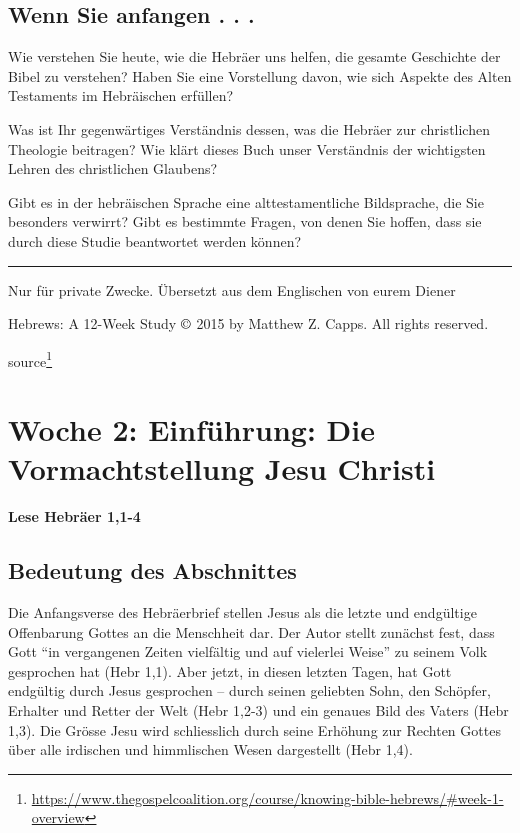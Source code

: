 \documentclass[
  12pt,
]{krantz}
\makeatletter
\newenvironment{kframe}{%
\medskip{}
\setlength{\fboxsep}{.8em}
 \def\at@end@of@kframe{}%
 \ifinner\ifhmode%
  \def\at@end@of@kframe{\end{minipage}}%
  \begin{minipage}{\columnwidth}%
 \fi\fi%
 \def\FrameCommand##1{\hskip\@totalleftmargin \hskip-\fboxsep
 \colorbox{shadecolor}{##1}\hskip-\fboxsep
     \hskip-\linewidth \hskip-\@totalleftmargin \hskip\columnwidth}%
 \MakeFramed {\advance\hsize-\width
   \@totalleftmargin\z@ \linewidth\hsize
   \@setminipage}}%
 {\par\unskip\endMakeFramed%
 \at@end@of@kframe}
\newenvironment{rmdblock}[1]
  {
  \begin{itemize}
  \renewcommand{\labelitemi}{
    \raisebox{-.7\height}[0pt][0pt]{
      {\setkeys{Gin}{width=3em,keepaspectratio}\texttt{[image: img/\#1]}}
    }
  }
  \setlength{\fboxsep}{1em}
  \begin{kframe}
  \item
  }
  {
  \end{kframe}
  \end{itemize}
  }
\newenvironment{rmdbible}
  {\begin{rmdblock}{bible}}
  {\end{rmdblock}}
\renewcommand{\href}[2]{#2\footnote{\url{#1}}}
\makeatother
\begin{document}
\hypertarget{wenn-sie-anfangen-.-.-.}{%
\section{Wenn Sie anfangen . . .}\label{wenn-sie-anfangen-.-.-.}}

Wie verstehen Sie heute, wie die Hebräer uns helfen, die gesamte Geschichte der Bibel zu verstehen? Haben Sie eine Vorstellung davon, wie sich Aspekte des Alten Testaments im Hebräischen erfüllen?

Was ist Ihr gegenwärtiges Verständnis dessen, was die Hebräer zur christlichen Theologie beitragen? Wie klärt dieses Buch unser Verständnis der wichtigsten Lehren des christlichen Glaubens?

Gibt es in der hebräischen Sprache eine alttestamentliche Bildsprache, die Sie besonders verwirrt? Gibt es bestimmte Fragen, von denen Sie hoffen, dass sie durch diese Studie beantwortet werden können?

\begin{center}\rule{0.5\linewidth}{0.5pt}\end{center}

Nur für private Zwecke. Übersetzt aus dem Englischen von eurem Diener

Hebrews: A 12-Week Study \(\copyright\) 2015 by Matthew Z. Capps. All rights reserved.

\href{https://www.thegospelcoalition.org/course/knowing-bible-hebrews/\#week-1-overview}{source}

\hypertarget{woche02}{%
\chapter{Woche 2: Einführung: Die Vormachtstellung Jesu Christi}\label{woche02}}

\begin{rmdbible}
\textbf{Lese Hebräer 1,1-4}
\end{rmdbible}

\hypertarget{bedeutung-des-abschnittes}{%
\section{Bedeutung des Abschnittes}\label{bedeutung-des-abschnittes}}

Die Anfangsverse des Hebräerbrief stellen Jesus als die letzte und endgültige Offenbarung Gottes an die Menschheit dar. Der Autor stellt zunächst fest, dass Gott ``in vergangenen Zeiten vielfältig und auf vielerlei Weise'' zu seinem Volk gesprochen hat (Hebr 1,1). Aber jetzt, in diesen letzten Tagen, hat Gott endgültig durch Jesus gesprochen -- durch seinen geliebten Sohn, den Schöpfer, Erhalter und Retter der Welt (Hebr 1,2-3) und ein genaues Bild des Vaters (Hebr 1,3). Die Grösse Jesu wird schliesslich durch seine Erhöhung zur Rechten Gottes über alle irdischen und himmlischen Wesen dargestellt (Hebr 1,4).
\end{document}
